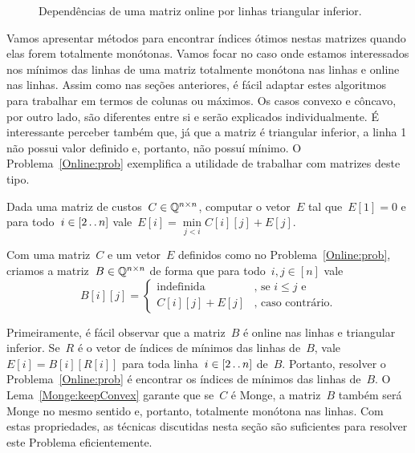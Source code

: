 \begin{figure}[h]
    \centering
    
    \caption{Dependências de uma matriz online por linhas triangular inferior.} \label{Online:matrix:fig}
\end{figure}

Vamos apresentar métodos para encontrar índices ótimos nestas matrizes quando elas forem totalmente monótonas. Vamos focar no caso onde estamos interessados nos mínimos das linhas de uma matriz totalmente monótona nas linhas e online nas linhas. Assim como nas seções anteriores, é fácil adaptar estes algoritmos para trabalhar em termos de colunas ou máximos. Os casos convexo e côncavo, por outro lado, são diferentes entre si e serão explicados individualmente. É interessante perceber também que, já que a matriz é triangular inferior, a linha 1 não possui valor definido e, portanto, não possuí mínimo. O Problema~\ref{Online:prob} exemplifica a utilidade de trabalhar com matrizes deste tipo.

\begin{prob} \label{Online:prob}
Dada uma matriz de custos~$C \in \mathbb{Q}^{n \times n}$, computar o vetor~$E$ tal que~$E[1] = 0$ e para todo~$i \in [2 \,.\,.\, n]$ vale~$E[i] = \min\limits_{j < i} C[i][j] + E[j]$.
\end{prob}

Com uma matriz~$C$ e um vetor~$E$ definidos como no Problema~\ref{Online:prob}, criamos a matriz~$B \in \mathbb{Q}^{n \times n}$ de forma que para todo~$i,j \in [n]$ vale
\begin{equation} \label{Online:Bmat}
    B[i][j] = \begin{cases}
        \text{indefinida} & \text{, se } i \leq j \text{ e } \\
        C[i][j] + E[j]    & \text{, caso contrário.}
    \end{cases}
\end{equation}

Primeiramente, é fácil observar que a matriz~$B$ é online nas linhas e triangular inferior. Se~$R$ é o vetor de índices de mínimos das linhas de~$B$, vale~$E[i] = B[i][R[i]]$ para toda linha~$i \in [2 \,.\,.\, n]$ de~$B$. Portanto, resolver o Problema~\ref{Online:prob} é encontrar os índices de mínimos das linhas de~$B$. O Lema~\ref{Monge:keepConvex} garante que se~$C$ é Monge, a matriz~$B$ também será Monge no mesmo sentido e, portanto, totalmente monótona nas linhas. Com estas propriedades, as técnicas discutidas nesta seção são suficientes para resolver este Problema eficientemente.

